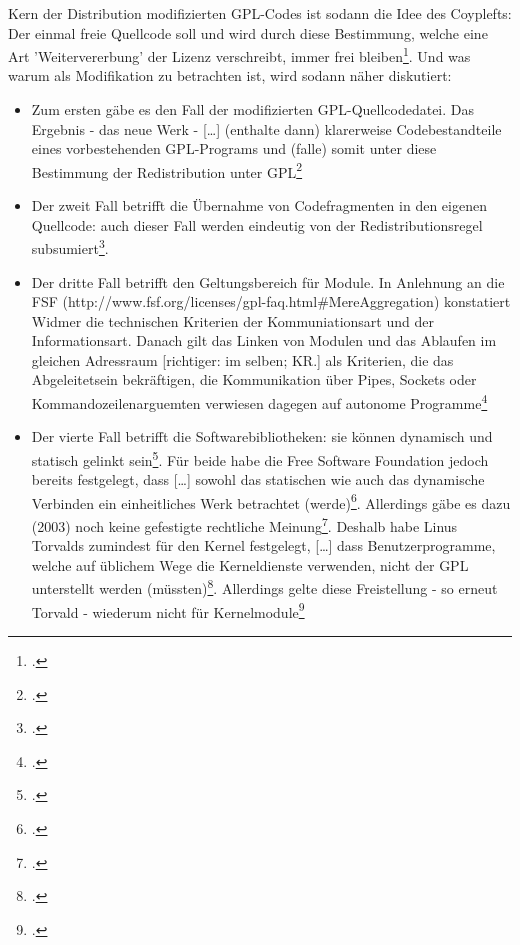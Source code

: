 \documentclass[DIV=calc,BCOR=5mm,11pt,headings=small,oneside,abstract=true, toc=bib]{scrartcl}
\begin{document}
Kern der Distribution modifizierten GPL-Codes ist sodann die Idee des Coyplefts:
\glqq{}Der einmal freie Quellcode soll und wird durch diese Bestimmung,
welche eine Art 'Weitervererbung' der Lizenz verschreibt, immer frei
bleiben\grqq{}\footcite[][137f]{Widmer2003a}. Und was warum als Modifikation
zu betrachten ist, wird sodann näher diskutiert:
\begin{itemize}
  \item Zum ersten gäbe es den Fall der modifizierten
  \glqq{}GPL-Quellcodedatei\grqq{}. Das Ergebnis - das neue \glqq{}Werk\grqq{} -
  \glqq{}[\ldots] (enthalte dann) klarerweise Codebestandteile eines
  vorbestehenden GPL-Programs und (falle) somit unter diese Bestimmung\grqq{}
  der Redistribution unter GPL\footcite[][138]{Widmer2003a}
  \item Der zweit Fall betrifft die \glqq{}Übernahme von Codefragmenten
  in den eigenen Quellcode\grqq{}: auch dieser Fall werden eindeutig von der
  Redistributionsregel subsumiert\footcite[][138]{Widmer2003a}.
  \item Der dritte Fall betrifft den Geltungsbereich für Module. In Anlehnung an
  die FSF (http://www.fsf.org/licenses/gpl-faq.html\#MereAggregation)
  konstatiert Widmer die technischen Kriterien der Kommuniationsart und der Informationsart.
  Danach gilt das Linken von Modulen und das \glqq{}Ablaufen im gleichen
  Adressraum\grqq{} [richtiger: im selben; KR.] als Kriterien, die das
  Abgeleitetsein bekräftigen, die Kommunikation über Pipes, Sockets oder
  Kommandozeilenarguemten verwiesen dagegen auf autonome
  Programme\footcite[][139f]{Widmer2003a}
  \item Der vierte Fall betrifft die \glqq{}Softwarebibliotheken\grqq{}: sie
  können dynamisch und statisch gelinkt sein\footcite[][141]{Widmer2003a}. Für
  beide habe die Free Software Foundation jedoch bereits festgelegt, dass
  \glqq{}[\ldots] sowohl das statischen wie auch das dynamische Verbinden
  ein einheitliches Werk betrachtet (werde)\grqq{}\footcite[][142
  Belegt wird das durch den Rückgriff auf die LGPL-Lizenz, die
  genau dieses in Abs. 10 der Präambel so festlege]{Widmer2003a}. Allerdings
  gäbe es dazu (2003) \glqq{}noch keine gefestigte rechtliche
  Meinung\grqq{}\footcite[][142]{Widmer2003a}. Deshalb habe Linus Torvalds
  zumindest für den Kernel festgelegt, \glqq{}[\ldots] dass
  Benutzerprogramme, welche auf üblichem Wege die Kerneldienste
  verwenden, nicht der GPL unterstellt werden
  (müssten)\grqq{}\footcite[][142 Original unter DiBona Torvalds
  Kernelmodule.]{Widmer2003a}. Allerdings gelte diese Freistellung - so
  erneut Torvald - wiederum nicht für Kernelmodule\footcite[][142
  Original
  http://www.uwsg.iu.edu/hypermail/linux/kernel/2010.2/0603.html]{Widmer2003a}
\end{itemize}
\end{document}
